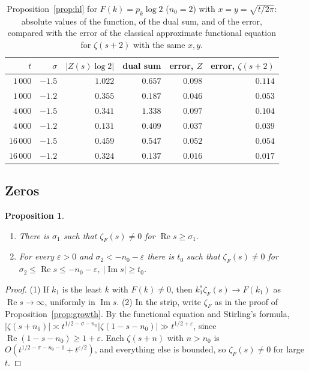 \documentclass[11pt,reqno]{amsart}
\newtheorem{proposition}[theorem]{Proposition}
\theoremstyle{definition}
\theoremstyle{remark}
\begin{document}
\begin{table}[t]
\centering\small
\caption{Proposition~\ref{prop:hl} for $F(k) = p_k\log 2$ ($n_0 = 2$) with $x = y = \sqrt{t/2\pi}$: absolute values of
the function, of the dual sum, and of the error, compared with the error of the classical approximate functional
equation for $\zeta(s+2)$ with the same $x, y$.}
\label{tab:hl}
\begin{tabular}{rrrrrr}
\toprule
$t$ & $\sigma$ & $|Z(s)\log 2|$ & dual sum & error, $Z$ & error, $\zeta(s+2)$ \\
\midrule
$1\,000$ & $-1.5$ & $1.022$ & $0.657$ & $0.098$ & $0.114$ \\
$1\,000$ & $-1.2$ & $0.355$ & $0.187$ & $0.046$ & $0.053$ \\
$4\,000$ & $-1.5$ & $0.341$ & $1.338$ & $0.097$ & $0.104$ \\
$4\,000$ & $-1.2$ & $0.131$ & $0.409$ & $0.037$ & $0.039$ \\
$16\,000$ & $-1.5$ & $0.459$ & $0.547$ & $0.052$ & $0.054$ \\
$16\,000$ & $-1.2$ & $0.324$ & $0.137$ & $0.016$ & $0.017$ \\
\bottomrule
\end{tabular}
\end{table}


\subsection{Zeros}\label{sec:zeros}

\begin{proposition}\label{prop:zerofree}
\begin{enumerate}
\item There is $\sigma_1$ such that $\zeta_F(s) \ne 0$ for $\operatorname{Re}s \ge \sigma_1$.
\item For every $\varepsilon > 0$ and $\sigma_2 < -n_0-\varepsilon$ there is $t_0$ such that $\zeta_F(s) \ne 0$ for
$\sigma_2 \le \operatorname{Re}s \le -n_0-\varepsilon$, $|\operatorname{Im}s| \ge t_0$.
\end{enumerate}
\end{proposition}

\begin{proof}
(1) If $k_1$ is the least $k$ with $F(k) \ne 0$, then $k_1^s\zeta_F(s) \to F(k_1)$ as $\operatorname{Re}s \to \infty$,
uniformly in $\operatorname{Im}s$. (2) In the strip, write $\zeta_F$ as in the proof of
Proposition~\ref{prop:growth}. By the functional equation and Stirling's formula,
$|\zeta(s+n_0)| \asymp t^{1/2-\sigma-n_0}|\zeta(1-s-n_0)| \gg t^{1/2+\varepsilon}$, since
$\operatorname{Re}(1-s-n_0) \ge 1+\varepsilon$. Each $\zeta(s+n)$ with $n > n_0$ is
$O(t^{1/2-\sigma-n_0-1}+t^{\varepsilon/2})$, and everything else is bounded, so $\zeta_F(s) \ne 0$ for large $t$.
\end{proof}
\end{document}
